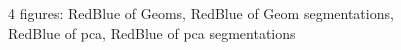 \begin{figure}[htbp]
            \caption{4 figures: RedBlue of Geoms, RedBlue of Geom segmentations, RedBlue of pca, RedBlue of pca segmentations}
      \label{fig:pca}
    \end{figure}
    
